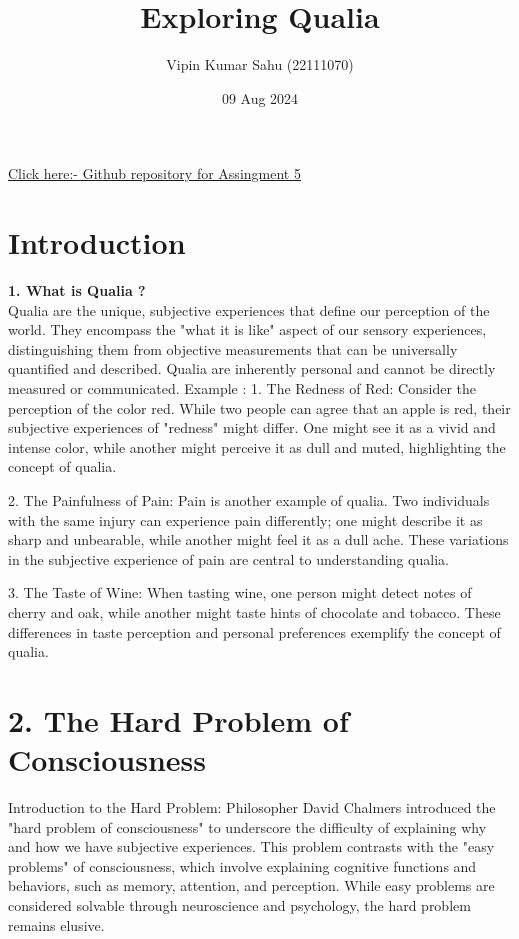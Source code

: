 \documentclass{article}
\title{Exploring Qualia}
\author{Vipin Kumar Sahu (22111070)}
\date{09 Aug 2024}
\begin{document}
\maketitle
\href{https://github.com/Vipin70Sahu/Assingment.git}{Click here:- Github repository for Assingment 5}
\section{Introduction}


\textbf{ 1. What is Qualia ? } \\
\LARGE Qualia are the unique, subjective experiences that define our perception of the world. They encompass the "what it is like" aspect of our sensory experiences, distinguishing them from objective measurements that can be universally quantified and described. Qualia are inherently personal and cannot be directly measured or communicated.
\LARGE Example :
\LARGE 
1. The Redness of Red: Consider the perception of the color red. While two people can agree that an apple is red, their subjective experiences of "redness" might differ. One might see it as a vivid and intense color, while another might perceive it as dull and muted, highlighting the concept of qualia.

2. The Painfulness of Pain: Pain is another example of qualia. Two individuals with the same injury can experience pain differently; one might describe it as sharp and unbearable, while another might feel it as a dull ache. These variations in the subjective experience of pain are central to understanding qualia.

3. The Taste of Wine: When tasting wine, one person might detect notes of cherry and oak, while another might taste hints of chocolate and tobacco. These differences in taste perception and personal preferences exemplify the concept of qualia.
\vspace{2em}

\section*{2. The Hard Problem of Consciousness  } 
Introduction to the Hard Problem:
Philosopher David Chalmers introduced the "hard problem of consciousness" to underscore the difficulty of explaining why and how we have subjective experiences. This problem contrasts with the "easy problems" of consciousness, which involve explaining cognitive functions and behaviors, such as memory, attention, and perception. While easy problems are considered solvable through neuroscience and psychology, the hard problem remains elusive.
\end{document}
